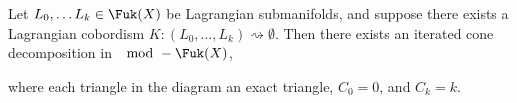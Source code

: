 
Let $L_0, \ldots L_k\in \Fuk(X)$ be Lagrangian submanifolds, and suppose there exists a Lagrangian cobordism $K: (L_0, \ldots, L_k)\rightsquigarrow \emptyset$. Then there exists an iterated cone decomposition in $\mod-\Fuk(X)$,

where each triangle in the diagram an exact triangle, $C_0=0$, and $C_k=k$.